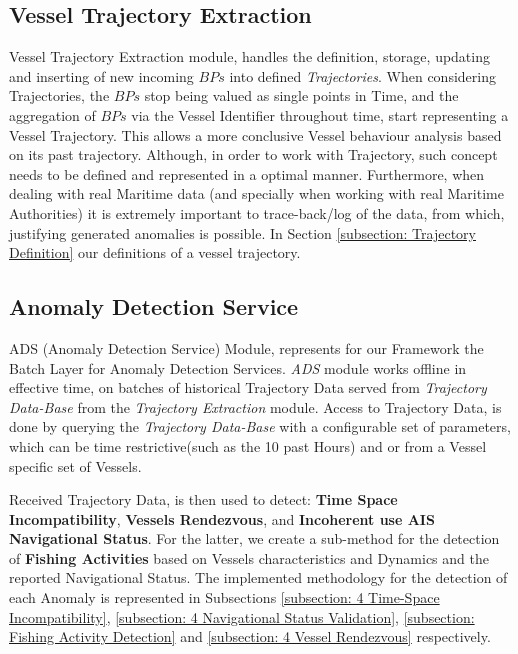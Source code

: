 \subsection{Vessel Trajectory Extraction}
\label{subsection: 3 Vessel Trajectory Extraction}

Vessel Trajectory Extraction module, handles the definition, storage,  updating and inserting of new incoming $BPs$ into defined \emph{Trajectories}.
When considering Trajectories, the $BPs$ stop being valued as single points in Time, and the aggregation of $BPs$ via the Vessel Identifier throughout time, start representing a Vessel Trajectory. This allows a more conclusive Vessel behaviour analysis based on its past trajectory. Although, in order to work with Trajectory, such concept needs to be defined and represented in a optimal manner. Furthermore, when dealing with real Maritime data (and specially when working with real Maritime Authorities) it is extremely important to trace-back/log of the data, from which, justifying generated anomalies is possible. 
In Section \ref{subsection: Trajectory Definition} our definitions of a vessel trajectory. 


\subsection{Anomaly Detection Service}
\label{subsection: 3 ADS}
ADS (Anomaly Detection Service) Module, represents for our Framework the Batch Layer for Anomaly Detection Services. \emph{ADS} module works offline in effective time, on batches of historical Trajectory Data served from \emph{Trajectory Data-Base} from the \emph{Trajectory Extraction} module. Access to Trajectory Data, is done by querying the \emph{Trajectory Data-Base} with a configurable set of parameters, which can be time restrictive(such as the 10 past Hours) and or from a Vessel specific set of Vessels. 

Received Trajectory Data, is then used to detect: \textbf{Time Space Incompatibility}, \textbf{Vessels Rendezvous}, and \textbf{Incoherent use AIS Navigational Status}. For the latter, we create a sub-method for the detection of \textbf{Fishing Activities} based on Vessels characteristics and Dynamics and the reported Navigational Status.
The implemented methodology for the detection of each Anomaly is represented in Subsections \ref{subsection: 4 Time-Space Incompatibility}, \ref{subsection: 4 Navigational Status Validation}, \ref{subsection: Fishing Activity Detection} and \ref{subsection: 4 Vessel Rendezvous} respectively.


